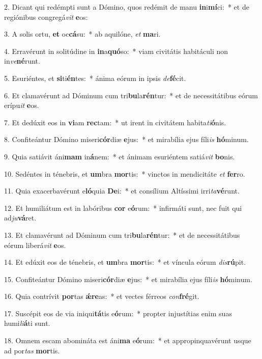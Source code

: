 2. Dicant qui redémpti sunt a Dómino, quos redémit de manu \textbf{in}i\textbf{mí}ci:~*  et de regiónibus congregá\textit{vit} \textbf{e}os:\

3. A solis ortu, \textbf{et} oc\textbf{cá}su:~*  ab aquilóne, \textit{et} \textbf{ma}ri.\

4. Erravérunt in solitúdine in \textbf{in}a\textbf{quó}so:~*  viam civitátis habitáculi non in\textit{ve}\textbf{né}runt.\

5. Esuriéntes, et \textbf{si}ti\textbf{én}tes:~*  ánima eórum in ipsis \textit{de}\textbf{fé}cit.\

6. Et clamavérunt ad Dóminum cum tri\textbf{bu}la\textbf{rén}tur:~*  et de necessitátibus eórum erípu\textit{it} \textbf{e}os.\

7. Et dedúxit eos in \textbf{vi}am \textbf{rec}tam:~*  ut irent in civitátem habita\textit{ti}\textbf{ó}nis.\

8. Confiteántur Dómino miseri\textbf{cór}diæ \textbf{e}jus:~*  et mirabília ejus fíli\textit{is} \textbf{hó}minum.\

9. Quia satiávit áni\textbf{mam} in\textbf{á}nem:~*  et ánimam esuriéntem satiá\textit{vit} \textbf{bo}nis.\

10. Sedéntes in ténebris, et \textbf{um}bra \textbf{mor}tis:~*  vinctos in mendicitáte \textit{et} \textbf{fer}ro.\

11. Quia exacerbavérunt e\textbf{ló}quia \textbf{De}i:~*  et consílium Altíssimi irri\textit{ta}\textbf{vé}runt.\

12. Et humiliátum est in labóribus \textbf{cor} e\textbf{ó}rum:~*  infirmáti sunt, nec fuit qui ad\textit{ju}\textbf{vá}ret.\

13. Et clamavérunt ad Dóminum cum tri\textbf{bu}la\textbf{rén}tur:~*  et de necessitátibus eórum liberá\textit{vit} \textbf{e}os.\

14. Et edúxit eos de ténebris, et \textbf{um}bra \textbf{mor}tis:~*  et víncula eórum \textit{dis}\textbf{rú}pit.\

15. Confiteántur Dómino miseri\textbf{cór}diæ \textbf{e}jus:~*  et mirabília ejus fíli\textit{is} \textbf{hó}minum.\

16. Quia contrívit \textbf{por}tas \textbf{ǽ}\textbf{re}as:~*  et vectes férreos \textit{con}\textbf{fré}git.\

17. Suscépit eos de via iniqui\textbf{tá}tis e\textbf{ó}rum:~*  propter injustítias enim suas humi\textit{li}\textbf{á}ti sunt.\

18. Omnem escam abomináta est áni\textbf{ma} e\textbf{ó}rum:~*  et appropinquavérunt usque ad por\textit{tas} \textbf{mor}tis.\

